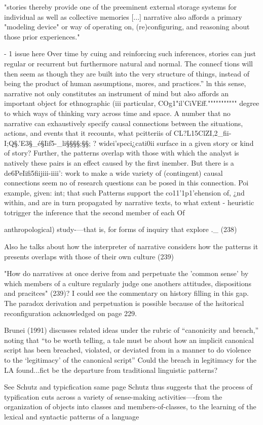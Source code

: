 


"stories thereby provide one of the preeminent external storage systems for individual as well as collective memories [...] narrative also affords a primary "modeling device" or way of operating on, (re)configuring, and reasoning about those prior experiences." \cite[229]{Herman..?}

- 1 issue here Over time by cuing and reinforcing such inferences, stories can
just regular or recurrent but furthermore natural and normal. The connecf
tions will then seem as though they are built into the very structure of
things, instead of being the product of human assumptions, mores, and
practices.”
ln this sense, narrative not only constitutes an instrument of mind but
also affords an important object for ethnographic (iii particular, COg1"il’CiVEff."""""""""""
degree to which ways of thinking vary across time and space. A number
that no narrative can exhaustively specify causal connections between the
situations, actions, and events that it recounts, what pcitteriis of CL?L15ClZI,2_fii-I;Q§.'E3§_é§Iif5-_li§§§§;§§; ?
widei'speci¿cati0ii surface in a given story or kind of story? Further,
the patterns overlap with those with which the analyst is natively
these pairs is an effect caused by the first inember. But there is a de6PeIifi5fiijiii-iiii':%
work to make a wide variety of (contingent) causal connections seem no
of research questions can be posed in this connection. Poi example, given:
int; that such Patterns support the co11'1p1'ehension of, ¿nd
within, and are in turn propagated by narrative texts, to what extent
-
heuristic totrigger the inference that the second member of each Of

anthropological) study-—that is, for forms of inquiry that explore ._ (238)

Also he talks about how the interpreter of narrative considers how the patterns it presents overlaps with those of their own culture (239)

"How do narratives at once derive from and perpetuate the 'common sense' by which members of a culture regularly judge one anothers attitudes, dispositions and pracitces" (239)? 
	I could see the commentary on history filling in this gap. The paradox derivation and perpetuation is possible because of the hsitorical reconfiguration acknowledged on page 229.


 Brunei (1991) discusses related ideas under the rubric of “canonicity
and breach,” noting that “to be worth telling, a tale must be about how
an implicit canonical script has been breached, violated, or deviated from
in a manner to do violence to the ‘legitimacy’ of the canonical script” \cite[239]{Herman}
	Could the breach in legitimacy for the LA found...fict be the departure from traditional linguistic patterns?

See Schutz and typicfication same page
Schutz thus suggests that the process of typification cuts across a variety of
sense-making activities—-from the organization of objects into classes and
members-of-classes, to the learning of the lexical and syntactic patterns of
a language